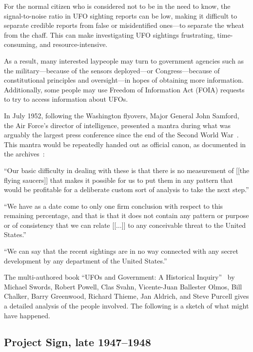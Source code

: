 For the normal citizen who is considered not to be in the need to know, the signal-to-noise ratio in UFO sighting reports can be low,
making it difficult to separate credible reports from false or misidentified ones---to separate the wheat from the chaff.
This can make investigating UFO sightings frustrating, time-consuming, and resource-intensive.

As a result, many interested laypeople may turn to government agencies such as the military---because of the sensors deployed---or
Congress---because of constitutional principles and oversight---in hopes of obtaining more information. Additionally, some people may use Freedom of Information Act (FOIA) requests to try to access information about UFOs.



In July 1952, following the Washington flyovers, Major General John Samford, the Air Force's director of intelligence, presented a mantra during what was arguably the largest press conference since the end of the Second World War~\cite{Lewis-Kraus2021Apr}. This mantra would be repeatedly handed out as official canon, as documented in the archives~\cite{Archives1952}:
\begin{svgraybox}
``Our basic difficulty in dealing with these is that there is no measurement of [[the flying saucers]]
that makes it possible for us to put them in any pattern that would be profitable for a deliberate custom sort of analysis to take the next step.''

``We have as a date come to only one firm conclusion with respect to this remaining percentage,
and that is that it does not contain any pattern or purpose or of consistency
that we can relate [[$\ldots$]] to any conceivable threat to the United States.''

``We can say that the recent sightings are in no way connected with any secret development by any department of the United States.''
\end{svgraybox}

The multi-authored book ``{UFO}s and Government: {A} Historical Inquiry''~\cite{Swords2012Jul}
by Michael Swords,  Robert Powell,  Clas Svahn, Vicente-Juan Ballester Olmos,
Bill Chalker,  Barry Greenwood,
Richard Thieme,  Jan Aldrich, and Steve Purcell gives a detailed analysis of the people involved.
The following is a sketch of what might have happened.

\subsection{Project Sign, late 1947--1948}
\label{2023-UFO-part-Perception-types-USA-Sign}


